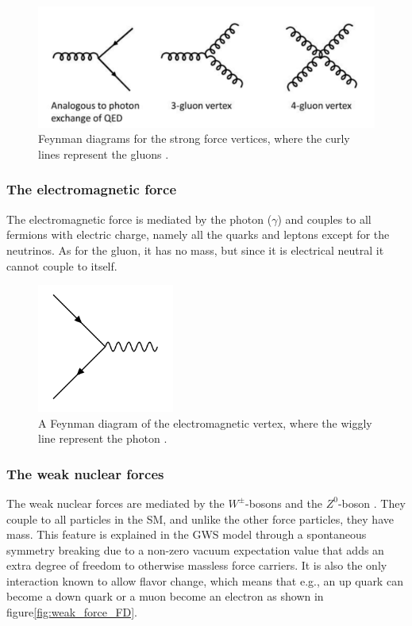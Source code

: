 \begin{figure}[H]
    \centering
    \includegraphics[width = \textwidth]{Figures/FeynmanDiagrams/gluon.pdf}
    \caption{Feynman diagrams for the strong force vertices, where the curly lines represent the gluons \cite{STRONGforce}.}
    \label{fig:gluon_self_int}
\end{figure}

\subsubsection{The electromagnetic force}
The electromagnetic force is mediated by the photon ($\gamma$) \cite{thomson} and couples to all fermions with electric charge, namely all the quarks and leptons except for the neutrinos. As for the gluon, it has no mass, but since it is electrical neutral it cannot couple to itself. 

\begin{figure}[H]
    \centering
    \includegraphics[width = 0.4\textwidth]{Figures/FeynmanDiagrams/photon.png}
    \caption{A Feynman diagram of the electromagnetic vertex, where the wiggly line represent the photon \cite{EMforce}.}
    \label{fig:my_label}
\end{figure}

\subsubsection{The weak nuclear forces}
The weak nuclear forces are mediated by the $W^\pm$-bosons and the $Z^0$-boson \cite{thomson}. They couple to all particles in the SM, and unlike the other force particles, they have mass. This feature is explained in the GWS model \cite{Xin2007GlashowWeinbergSalamMA} through a spontaneous symmetry breaking due to a non-zero vacuum expectation value that adds an extra degree of freedom to otherwise massless force carriers. It is also the only interaction known to allow flavor change, which means that e.g., an up quark can become a down quark or a muon become an electron as shown in figure\ref{fig:weak_force_FD}. 

